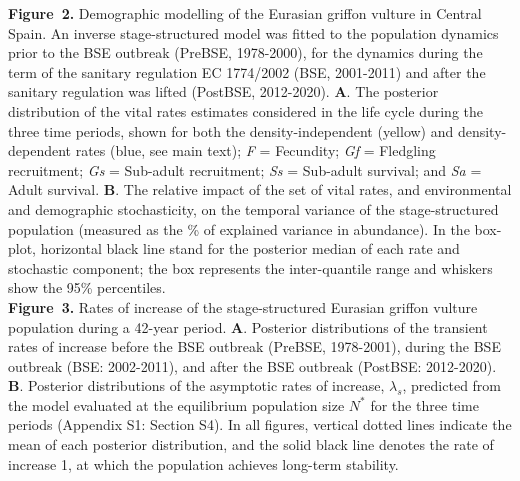 \documentclass[12pt]{article}
\begin{document}
\noindent \textbf{Figure~2.} Demographic modelling of the Eurasian griffon vulture in Central Spain. An inverse stage-structured model was fitted to the population dynamics prior to the BSE outbreak (PreBSE, 1978-2000), for the dynamics during the term of the sanitary regulation EC 1774/2002 (BSE, 2001-2011) and after the sanitary regulation was lifted (PostBSE, 2012-2020). \textbf{A}. The posterior distribution of the vital rates estimates considered in the life cycle during the three time periods, shown for both the density-independent (yellow) and density-dependent rates (blue, see main text); \textit{F} = Fecundity; \textit{Gf} = Fledgling recruitment; \textit{Gs} = Sub-adult recruitment; \textit{Ss} = Sub-adult survival; and \textit{Sa} = Adult survival. \textbf{B}. The relative impact of the set of vital rates, and environmental and demographic stochasticity, on the temporal variance of the stage-structured population (measured as the \% of explained variance in abundance). In the box-plot, horizontal black line stand for the posterior median of each rate and stochastic component; the box represents the inter-quantile range and whiskers show the 95\% percentiles.  \\

\noindent \textbf{Figure~3.} Rates of increase of the stage-structured Eurasian griffon vulture population during a 42-year period. \textbf{A}. Posterior distributions of the transient rates of increase before the BSE outbreak (PreBSE, 1978-2001), during the BSE outbreak (BSE: 2002-2011), and after the BSE outbreak (PostBSE: 2012-2020). \textbf{B}. Posterior distributions of the asymptotic rates of increase, $\lambda_{s}$, predicted from the model evaluated at the equilibrium population size $N^*$ for the three time periods (Appendix S1: Section S4). In all figures, vertical dotted lines indicate the mean of each posterior distribution, and the solid black line denotes the rate of increase 1, at which the population achieves long-term stability.\\
\end{document}
